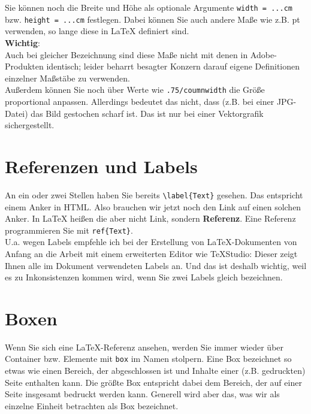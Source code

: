 Sie können noch die Breite und Höhe als optionale Argumente \verb|width = ...cm| bzw. \verb|height = ...cm| festlegen. Dabei können Sie auch andere Maße wie z.B. pt verwenden, so lange diese in LaTeX definiert sind.\\

\textbf{Wichtig}:\\

Auch bei gleicher Bezeichnung sind diese Maße nicht mit denen in Adobe-Produkten identisch; leider beharrt besagter Konzern darauf eigene Definitionen einzelner Maßstäbe zu verwenden.\\

Außerdem können Sie noch über Werte wie \verb|.75/coumnwidth| die Größe proportional anpassen. Allerdings bedeutet das nicht, dass (z.B. bei einer JPG-Datei) das Bild gestochen scharf ist. Das ist nur bei einer Vektorgrafik sichergestellt.

\section{Referenzen und Labels}

An ein oder zwei Stellen haben Sie bereits \verb|\label{Text}| gesehen. Das entspricht einem Anker in HTML. Also brauchen wir jetzt noch den \glqq{}Link\grqq{} auf einen solchen Anker. In LaTeX heißen die aber nicht Link, sondern \textbf{Referenz}. Eine Referenz programmieren Sie mit \verb|ref{Text}|.\\

U.a. wegen Labels empfehle ich bei der Erstellung von LaTeX-Dokumenten von Anfang an die Arbeit mit einem erweiterten Editor wie TeXStudio: Dieser zeigt Ihnen alle im Dokument verwendeten Labels an. Und das ist deshalb wichtig, weil es zu Inkonsistenzen kommen wird, wenn Sie zwei Labels gleich bezeichnen.

\section{Boxen}

Wenn Sie sich eine LaTeX-Referenz ansehen, werden Sie immer wieder über Container bzw. Elemente mit \verb|box| im Namen stolpern. Eine Box bezeichnet so etwas wie einen Bereich, der abgeschlossen ist und Inhalte einer (z.B. gedruckten) Seite enthalten kann. Die größte Box entspricht dabei dem Bereich, der auf einer Seite insgesamt bedruckt werden kann. Generell wird aber das, was wir als einzelne Einheit betrachten als Box bezeichnet.\\

